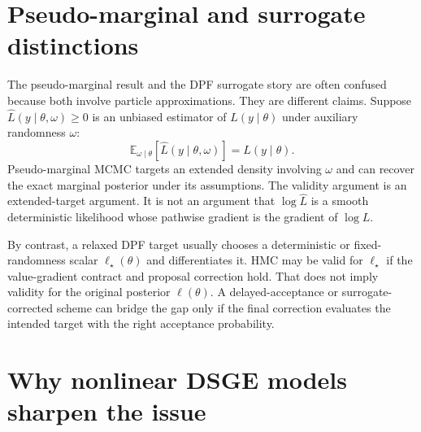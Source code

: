\section{Pseudo-marginal and surrogate distinctions}
\label{sec:bf-dpf-hmc-pm-surrogate}

The pseudo-marginal result and the DPF surrogate story are often confused
because both involve particle approximations.  They are different claims.
Suppose $\widehat{L}(y\mid\theta,\omega)\ge 0$ is an unbiased estimator of
$L(y\mid\theta)$ under auxiliary randomness $\omega$:
\[
  \mathbb{E}_{\omega\mid\theta}\left[\widehat{L}(y\mid\theta,\omega)\right]
  =
  L(y\mid\theta).
\]
Pseudo-marginal MCMC targets an extended density involving $\omega$ and can
recover the exact marginal posterior under its assumptions.  The validity
argument is an extended-target argument.  It is not an argument that
$\log\widehat{L}$ is a smooth deterministic likelihood whose pathwise gradient
is the gradient of $\log L$.

By contrast, a relaxed DPF target usually chooses a deterministic or
fixed-randomness scalar $\ell_\star(\theta)$ and differentiates it.  HMC may be
valid for $\ell_\star$ if the value-gradient contract and proposal correction
hold.  That does not imply validity for the original posterior
$\ell(\theta)$.  A delayed-acceptance or surrogate-corrected scheme can bridge
the gap only if the final correction evaluates the intended target with the
right acceptance probability.

\section{Why nonlinear DSGE models sharpen the issue}
\label{sec:bf-dpf-hmc-dsge}

